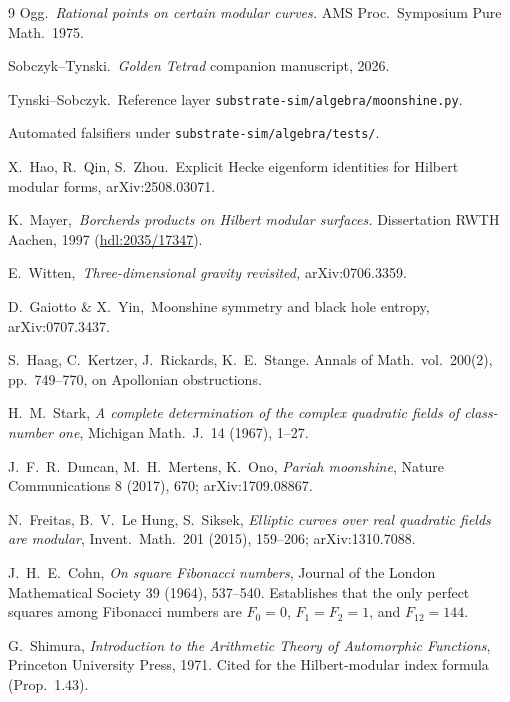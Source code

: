\documentclass[11pt,a4paper]{article}
\theoremstyle{plain}
\theoremstyle{definition}
\theoremstyle{remark}
\numberwithin{equation}{section}
\begin{document}
\begin{thebibliography}{9}
 Ogg.\ \emph{Rational points on certain modular curves.}
  AMS Proc.\ Symposium Pure Math.\ 1975.

 Sobczyk--Tynski.\ \emph{Golden Tetrad} companion manuscript, 2026.

 Tynski--Sobczyk.\ Reference layer
  \texttt{substrate-sim/algebra/moonshine.py}.

  Automated falsifiers under \texttt{substrate-sim/algebra/tests/}.

  X.\ Hao, R.\ Qin, S.\ Zhou.\ Explicit Hecke eigenform identities for Hilbert modular forms,
  arXiv:2508.03071.

  K.\ Mayer,\ \emph{Borcherds products on Hilbert modular surfaces.}
  Dissertation RWTH Aachen, 1997 (\href{http://hdl.handle.net/2035/17347}{hdl:2035/17347}).

  E.\ Witten,\ \emph{Three-dimensional gravity revisited,} arXiv:0706.3359.

  D.\ Gaiotto \& X.\ Yin,\ Moonshine symmetry and black hole entropy, arXiv:0707.3437.

  S.\ Haag, C.\ Kertzer, J.\ Rickards, K.\ E.\ Stange.
  Annals of Math.\ vol.\ 200(2), pp.\ 749--770, on Apollonian obstructions.

  H.\ M.\ Stark, \emph{A complete determination of the complex quadratic fields
  of class-number one}, Michigan Math.\ J.\ 14 (1967), 1--27.

  J.\ F.\ R.\ Duncan, M.\ H.\ Mertens, K.\ Ono,
  \emph{Pariah moonshine}, Nature Communications 8 (2017), 670;
  arXiv:1709.08867.

  N.\ Freitas, B.\ V.\ Le Hung, S.\ Siksek,
  \emph{Elliptic curves over real quadratic fields are modular},
  Invent.\ Math.\ 201 (2015), 159--206; arXiv:1310.7088.

  J.\ H.\ E.\ Cohn,
  \emph{On square Fibonacci numbers},
  Journal of the London Mathematical Society 39 (1964), 537--540.
  Establishes that the only perfect squares among Fibonacci numbers are
  $F_{0}=0$, $F_{1}=F_{2}=1$, and $F_{12}=144$.

  G.\ Shimura,
  \emph{Introduction to the Arithmetic Theory of Automorphic Functions},
  Princeton University Press, 1971.  Cited for the Hilbert-modular index
  formula (Prop.~1.43).


\end{thebibliography}
\end{document}
